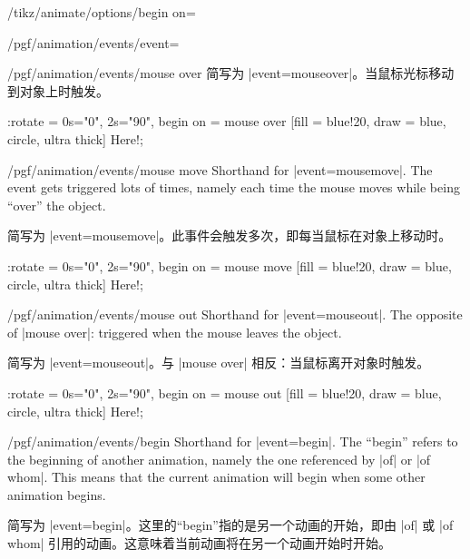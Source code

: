 \begin{key}{/tikz/animate/options/begin on=}
\begin{key}{/pgf/animation/events/event=}
\begin{key}{/pgf/animation/events/mouse over}
            简写为 |event=mouseover|。当鼠标光标移动到对象上时触发。
\begin{codeexample}[width=2cm,preamble={\usetikzlibrary{animations}}]
\tikz \node :rotate = { 0s="0", 2s="90", begin on = {mouse over} }
  [fill = blue!20, draw = blue, circle, ultra thick] {Here!};
\end{codeexample}
        \end{key}
        \begin{key}{/pgf/animation/events/mouse move}
            Shorthand for |event=mousemove|. The event gets triggered lots of
            times, namely each time the mouse moves while being ``over'' the
            object.
            
            简写为 |event=mousemove|。此事件会触发多次，即每当鼠标在对象上移动时。
\begin{codeexample}[width=2cm,preamble={\usetikzlibrary{animations}}]
\tikz \node :rotate = { 0s="0", 2s="90", begin on = {mouse move} }
  [fill = blue!20, draw = blue, circle, ultra thick] {Here!};
\end{codeexample}
        \end{key}
        \begin{key}{/pgf/animation/events/mouse out}
            Shorthand for |event=mouseout|. The opposite of |mouse over|:
            triggered when the mouse leaves the object.
            
            简写为 |event=mouseout|。与 |mouse over| 相反：当鼠标离开对象时触发。
\begin{codeexample}[width=2cm,preamble={\usetikzlibrary{animations}}]
\tikz \node :rotate = { 0s="0", 2s="90", begin on = {mouse out} }
  [fill = blue!20, draw = blue, circle, ultra thick] {Here!};
\end{codeexample}
        \end{key}
        \begin{key}{/pgf/animation/events/begin}
            Shorthand for |event=begin|. The ``begin'' refers to the beginning
            of another animation, namely the one referenced by |of| or
            |of whom|. This means that the current animation will begin when
            some other animation begins.
            
            简写为 |event=begin|。这里的“begin”指的是另一个动画的开始，即由 |of| 或 |of whom| 引用的动画。这意味着当前动画将在另一个动画开始时开始。



\end{key}
\end{key}
\end{key}
